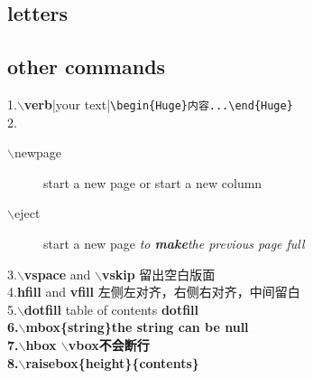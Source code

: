 \documentclass{article}[20pt]{}
\begin{document}
\subsection{letters}
\subsection{other commands}
1.{\bf$\backslash$verb}|your text|\verb|\begin{Huge}内容...\end{Huge}|\\
2.\begin{description}
	\item[$\backslash$newpage] start a new page or start a new column
	\item[$\backslash$eject] start a new page {\it to {\bf make}the previous page full}
\end{description}
3.{\bf$\backslash$vspace } and {\bf $\backslash$vskip} 留出空白版面\\
4.{\bf hfill}  and {\bf vfill} 左侧左对齐，右侧右对齐，中间留白\\
5.{\bf $\backslash$dotfill} table of contents \dotfill \bf dotfill\\
6.{\bf $\backslash$mbox\{string\}}the string can be null\\
7.{\bf $\backslash$hbox $\backslash$vbox}不会断行\\
8.{\bf $\backslash$raisebox\{height\}\{contents\}}\\
\end{document}
